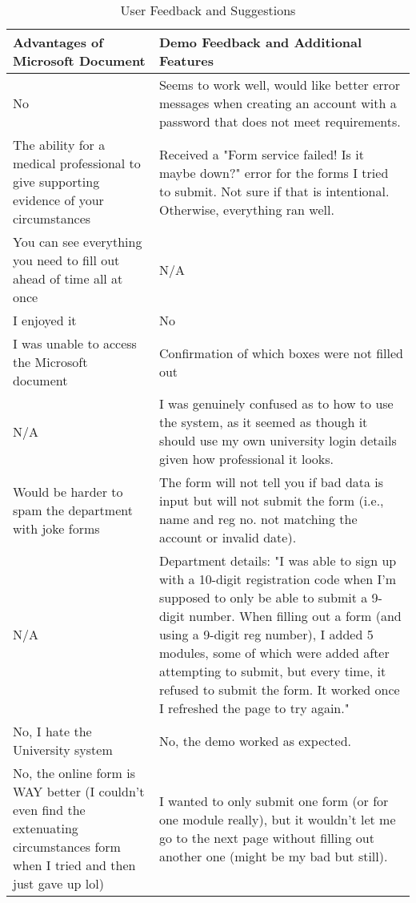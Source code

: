 \begin{table}[H]
\centering
\begin{tabularx}{\linewidth}{X|X}
\toprule
\textbf{Advantages of Microsoft Document} & \textbf{Demo Feedback and Additional Features}\\
\midrule
No & Seems to work well, would like better error messages when creating an account with a password that does not meet requirements.\\
The ability for a medical professional to give supporting evidence of your circumstances & Received a "Form service failed! Is it maybe down?" error for the forms I tried to submit. Not sure if that is intentional. Otherwise, everything ran well.\\
You can see everything you need to fill out ahead of time all at once & N/A\\
I enjoyed it & No\\
I was unable to access the Microsoft document & Confirmation of which boxes were not filled out\\
N/A & I was genuinely confused as to how to use the system, as it seemed as though it should use my own university login details given how professional it looks.\\
Would be harder to spam the department with joke forms & The form will not tell you if bad data is input but will not submit the form (i.e., name and reg no. not matching the account or invalid date).\\
N/A & Department details: "I was able to sign up with a 10-digit registration code when I'm supposed to only be able to submit a 9-digit number. When filling out a form (and using a 9-digit reg number), I added 5 modules, some of which were added after attempting to submit, but every time, it refused to submit the form. It worked once I refreshed the page to try again."\\
No, I hate the University system & No, the demo worked as expected.\\
No, the online form is WAY better (I couldn't even find the extenuating circumstances form when I tried and then just gave up lol) & I wanted to only submit one form (or for one module really), but it wouldn't let me go to the next page without filling out another one (might be my bad but still).\\
\bottomrule
\end{tabularx}
\caption{User Feedback and Suggestions}
\label{tab:user_feedback_table}
\end{table}

